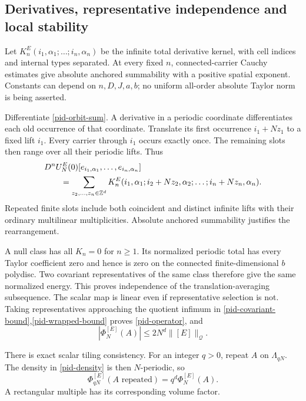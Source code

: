 \subsection{Derivatives, representative independence and local stability}
\label{pid-kernel-section}

Let $K_n^E(i_1,\alpha_1;\ldots;i_n,\alpha_n)$ be the infinite
total derivative kernel, with cell indices and internal types
separated. At every fixed $n$, connected-carrier Cauchy estimates
give absolute anchored summability with a positive spatial
exponent. Constants can depend on $n,D,J,a,b$; no uniform
all-order absolute Taylor norm is being asserted.

Differentiate \eqref{pid-orbit-sum}. A derivative in a periodic
coordinate differentiates each old occurrence of that coordinate.
Translate its first occurrence $i_1+Nz_1$ to a fixed lift $i_1$.
Every carrier through $i_1$ occurs exactly once. The remaining
slots then range over all their periodic lifts. Thus
\begin{align}
 &D^nU_N^E(0)[e_{i_1,\alpha_1},\ldots,e_{i_n,\alpha_n}]
 \notag\\
 &\qquad=\sum_{z_2,\ldots,z_n\in\mathbb Z^d}
 K_n^E(i_1,\alpha_1;
       i_2+Nz_2,\alpha_2;\ldots;i_n+Nz_n,\alpha_n).
 \label{pid-kernel-periodization}
\end{align}
Repeated finite slots include both coincident and distinct
infinite lifts with their ordinary multilinear multiplicities.
Absolute anchored summability justifies the rearrangement.

A null class has all $K_n=0$ for $n\ge1$. Its normalized
periodic total has every Taylor coefficient zero and hence is
zero on the connected finite-dimensional $b$ polydisc. Two
covariant representatives of the same class therefore give the
same normalized energy. This proves independence of the
translation-averaging subsequence. The scalar map is linear
even if representative selection is not. Taking representatives
approaching the quotient infimum in
\eqref{pid-covariant-bound},\eqref{pid-wrapped-bound} proves
\eqref{pid-operator}, and
\begin{equation}
 |\Phi_N^{[E]}(A)|\le2N^d\|[E]\|_{\mathcal Q}.
 \label{pid-energy-bound}
\end{equation}

There is exact scalar tiling consistency. For an integer $q>0$,
repeat $A$ on $\Lambda_{qN}$. The density in
\eqref{pid-density} is then $N$-periodic, so
\begin{equation}
 \Phi_{qN}^{[E]}(A\text{ repeated})=q^d\Phi_N^{[E]}(A).
 \label{pid-tiling}
\end{equation}
A rectangular multiple has its corresponding volume factor.

